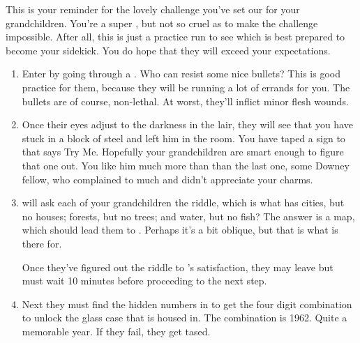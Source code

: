 \documentclass[green]{LRSguildcamp1}
\begin{document}
\name{\gGrandmasChallenge{}}

This is your reminder for the lovely challenge you've set our for your grandchildren. You're a super \cGrandma{\villain}, but not so cruel as to make the challenge impossible. After all, this is just a practice run to see which is best prepared to become your sidekick. You do hope that they will exceed your expectations. 

\begin{enumerate}
\item Enter \pGrandmasLair{} by going through a \sBullets{}. Who can resist some nice bullets? This is good practice for them, because they will be running a lot of errands for you. The bullets are of course, non-lethal.  At worst, they'll inflict minor flesh wounds.


\item Once their eyes adjust to the darkness in the lair, they will see that you have stuck \cChrisHemsworth{\intro} in a block of steel and left him in the room. You have taped a sign to \cChrisHemsworth{} that says Try Me. Hopefully your grandchildren are smart enough to figure that one out. You like him much more than than the last one, some Downey fellow,  who complained to much and didn't appreciate your charms. 


\item \cChrisHemsworth{} will ask each of your grandchildren the riddle, which is what has cities, but no houses; forests, but no trees; and water, but no fish? The answer is a map, which should lead them to \iArtworkThree{}. Perhaps it's a bit oblique, but that is what \cChrisHemsworth{} is there for. 

Once they've figured out the riddle to \cChrisHemsworth{}'s satisfaction, they may leave but must wait 10 minutes before proceeding to the next step. 

\item Next they must find the hidden numbers in \iArtworkThree{} to get the four digit combination to unlock the glass case that \iArtworkThree{} is housed in. The combination is 1962.  Quite a memorable year. If they fail, they get tased.  


\end{enumerate}
\end{document}
